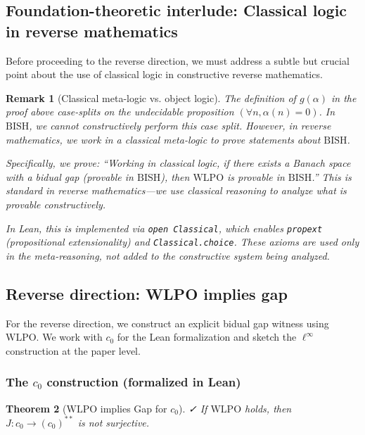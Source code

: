 \documentclass[11pt]{article}  %
\newtheorem{theorem}{Theorem}[section]
\newtheorem{remark}[theorem]{Remark}
\newenvironment{thm}{\begin{theorem}}{\end{theorem}}
\newenvironment{rem}{\begin{remark}}{\end{remark}}
\newcommand{\leanok}{\textsf{\small \textcolor{green!70!black}{✓}}}
\newcommand{\WLPO}{\mathrm{WLPO}}
\newcommand{\BISH}{\mathrm{BISH}}
\begin{document}
\subsection{Foundation-theoretic interlude: Classical logic in reverse mathematics}

Before proceeding to the reverse direction, we must address a subtle but crucial point about the use of classical logic in constructive reverse mathematics.

\begin{rem}[Classical meta-logic vs. object logic]\label{rem:meta-classical}
The definition of $g(\alpha)$ in the proof above case-splits on the undecidable proposition $(\forall n,\alpha(n)=0)$. In $\BISH$, we cannot constructively perform this case split. However, in reverse mathematics, we work in a \emph{classical meta-logic} to prove statements \emph{about} $\BISH$.

Specifically, we prove: ``Working in classical logic, if there exists a Banach space with a bidual gap (provable in $\BISH$), then $\WLPO$ is provable in $\BISH$.'' This is standard in reverse mathematics---we use classical reasoning to analyze what is provable constructively.

In Lean, this is implemented via \texttt{open Classical}, which enables \texttt{propext} (propositional extensionality) and \texttt{Classical.choice}. These axioms are used only in the meta-reasoning, not added to the constructive system being analyzed.
\end{rem}

\subsection{Reverse direction: WLPO implies gap}

For the reverse direction, we construct an explicit bidual gap witness using $\WLPO$. We work with $c_0$ for the Lean formalization and sketch the $\ell^\infty$ construction at the paper level.

\subsubsection{The $c_0$ construction (formalized in Lean)}

\begin{thm}[$\WLPO$ implies Gap for $c_0$]\label{thm:wlpo-gap-c0}\leanok
If $\WLPO$ holds, then $J:c_0\to (c_0)^{**}$ is not surjective.
\end{thm}
\end{document}
